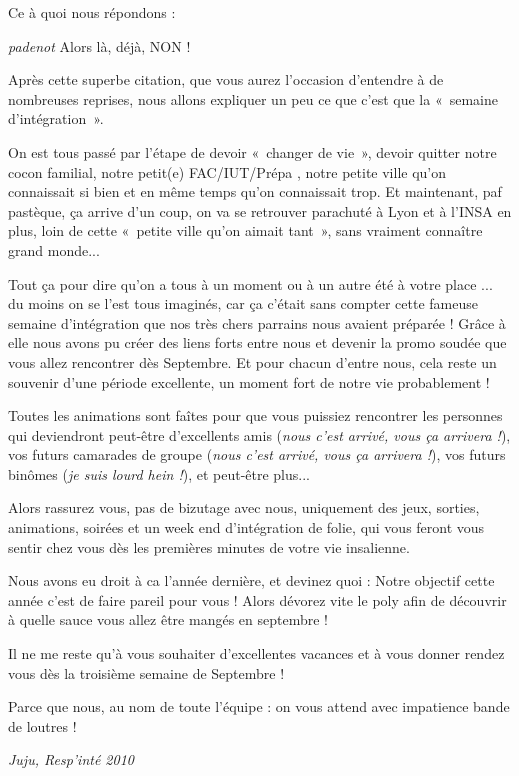 Ce à quoi nous répondons :

\begin{citationi}{ \emph{padenot} }
    Alors là, déjà, NON ! 
\end{citationi}

Après cette superbe citation, que vous aurez l'occasion d'entendre à de
nombreuses reprises, nous allons expliquer un peu ce que c'est que la «~semaine
d'intégration~».

On est tous passé par l'étape de devoir «~changer de vie~», devoir quitter notre
cocon familial, notre petit(e) FAC/IUT/Prépa , notre petite ville qu'on
connaissait si bien et en même temps qu'on connaissait trop.
Et maintenant, paf pastèque, ça arrive d'un coup, on va se retrouver parachuté
à Lyon et à l'INSA en plus, loin de cette «~petite ville qu'on aimait tant~»,
sans vraiment connaître grand monde...

Tout ça pour dire qu'on a tous à un moment ou à un autre été à votre place ...
du moins on se l'est tous imaginés, car ça c'était sans compter cette fameuse
semaine d'intégration que nos très chers parrains nous avaient préparée ! Grâce
à elle nous avons pu créer des liens forts entre nous et devenir la promo
soudée que vous allez rencontrer dès Septembre. Et pour chacun d'entre nous,
cela reste un souvenir d'une période excellente, un moment fort de notre
vie probablement !

Toutes les animations sont faîtes pour que vous puissiez rencontrer les
personnes qui deviendront peut-être d'excellents amis (\emph{nous c'est arrivé,
vous ça arrivera !}), vos futurs camarades de groupe (\emph{nous c'est
arrivé, vous ça arrivera !}), vos futurs binômes (\emph{je suis lourd
hein !}), et peut-être plus...

Alors rassurez vous, pas de bizutage avec nous, uniquement des jeux,
sorties, animations, soirées et un week end d'intégration de folie, qui
vous feront vous sentir chez vous dès les premières minutes de votre vie
insalienne.

Nous avons eu droit à ca l'année dernière, et devinez quoi : Notre objectif
cette année c'est de faire pareil pour vous ! Alors dévorez vite le poly afin
de découvrir à quelle sauce vous allez être mangés en septembre !

Il ne me reste qu'à vous souhaiter d'excellentes vacances et à vous donner
rendez vous dès la troisième semaine de Septembre !

Parce que nous, au nom de toute l'équipe : on vous attend avec impatience bande
de loutres !
\vspace{1cm}
\begin{flushright}
\emph{Juju, Resp'inté 2010}
\end{flushright}
\newpage
